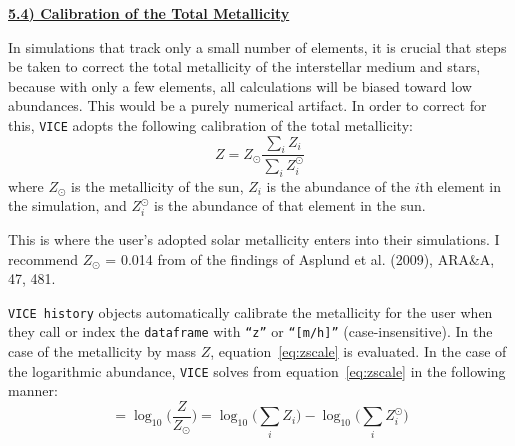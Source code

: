 \documentclass{report}
\newcommand\ddfrac[2]{\frac{\displaystyle #1}{\displaystyle #2}}
\begin{document}
\newpage 
\noindent 
\begin{center} 
\hypertarget{yields:zscale}{
	\underline{\LARGE
		\textbf{5.4) Calibration of the Total Metallicity}
	}
}
\end{center}
In simulations that track only a small number of elements, it is crucial that 
steps be taken to correct the total metallicity of the interstellar medium 
and stars, because with only a few elements, all calculations will be biased 
toward low abundances. This would be a purely numerical artifact. In order to 
correct for this, \texttt{VICE} adopts the following calibration of the 
total metallicity: 
\begin{equation}
\label{eq:zscale}
Z = Z_\odot \ddfrac{
	\sum_i Z_i
}{
	\sum_i Z_i^\odot
}
\end{equation}
where $Z_\odot$ is the metallicity of the sun, $Z_i$ is the abundance of the 
$i$th element in the simulation, and $Z_i^\odot$ is the abundance of that 
element in the sun. 
\par
This is where the user's adopted solar metallicity enters into their 
simulations. I recommend $Z_\odot$ = 0.014 from of the findings of 
Asplund et al. (2009), ARA\&A, 47, 481. 
\par
\texttt{VICE history} objects automatically calibrate the metallicity for the 
user when they call or index the \texttt{dataframe} with \texttt{``z''} or 
\texttt{``[m/h]''} (case-insensitive). In the case of the metallicity by 
mass $Z$, equation~\ref{eq:zscale} is evaluated. In the case of the logarithmic 
abundance, \texttt{VICE} solves from equation~\ref{eq:zscale} in the following 
manner: 
\begin{equation}
[M/H] = \log_{10}\Big(\frac{Z}{Z_\odot}\Big) = 
\log_{10}\Big(\sum_i Z_i\Big) - \log_{10}\Big(\sum_i Z_i^\odot\Big)
\end{equation}
\end{document}
